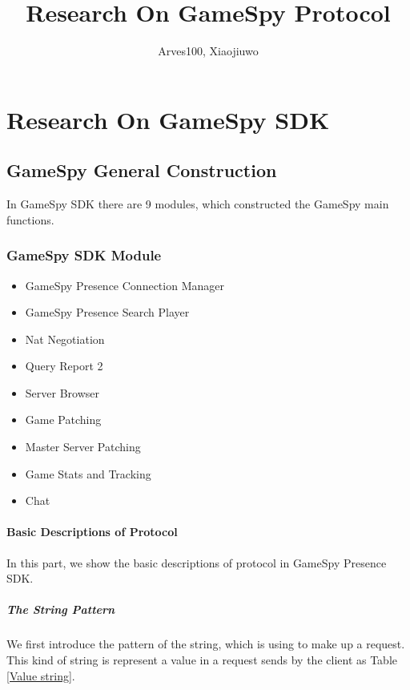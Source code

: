 \documentclass[oneside,titlepage,a4paper]{Definition/retrospy} %
\begin{document}
\title{\Huge\textbf{Research On GameSpy Protocol}} 
\author{Arves100, Xiaojiuwo}



\maketitle  %

\tableofcontents  %


\part{Research On GameSpy SDK}

\chapter{GameSpy General Construction}
\par In GameSpy SDK there are 9 modules, which constructed the GameSpy main functions.
\section{GameSpy SDK Module}
\begin{itemize}
	\item GameSpy Presence Connection Manager
	\item GameSpy Presence Search Player
	\item Nat Negotiation
	\item Query Report 2
	\item Server Browser
	\item Game Patching 
	\item Master Server Patching 
	\item Game Stats and Tracking 
	\item Chat 
\end{itemize}
\subsection{Basic Descriptions of Protocol}
In this part, we show the basic descriptions of protocol in GameSpy Presence SDK.
\subsubsection{The String Pattern}
We first introduce the pattern of the string, which is using to make up a request.
This kind of string is represent a value in a request sends by the client as Table \ref{Value string}.
\end{document}
